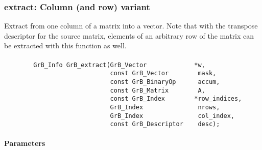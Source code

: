 \subsubsection{{\sf extract}: Column (and row) variant}

Extract from one column of a matrix into a vector.  Note that with the transpose
descriptor for the source matrix, elements of an arbitrary row of the matrix
can be extracted with this function as well.

\paragraph{\syntax}

\begin{verbatim}
        GrB_Info GrB_extract(GrB_Vector             *w,
                             const GrB_Vector        mask,
                             const GrB_BinaryOp      accum,
                             const GrB_Matrix        A,
                             const GrB_Index        *row_indices,
                             GrB_Index               nrows,
                             GrB_Index               col_index,
                             const GrB_Descriptor    desc); 
\end{verbatim}

\paragraph{Parameters}

